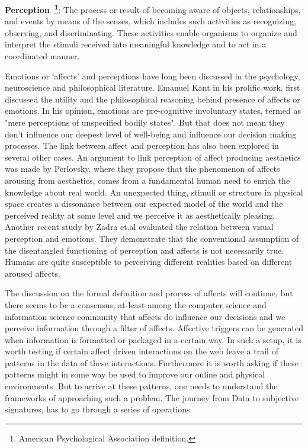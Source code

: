 \begin{definition}
    \textbf{Perception~\footnote{American Psychological Association definition.}}: The process or result of becoming aware of objects, relationships, and events by means of the senses, which includes such activities as recognizing, observing, and discriminating. These activities enable organisms to organize and interpret the stimuli received into meaningful knowledge and to act in a coordinated manner.
\end{definition}


Emotions or `affects' and perceptions have long been discussed in the psychology, neuroscience and philosophical literature. Emanuel Kant in his prolific work, first discussed the utility and the philosophical reasoning behind presence of affects or emotions\cite{kant1987critique}. In his opinion, emotions are pre-cognitive involuntary states, termed as "mere perceptions of unspecified bodily states"\cite{borges2004can}. But that does not mean they don't influence our deepest level of well-being and influence our decision making processes.
The link between affect and perception has also been explored in several other cases. An argument to link perception of affect producing aesthetics was made by Perlovsky\cite{perlovsky2014aesthetic}, where they propose that the phenomenon of affects arousing from aesthetics, comes from a fundamental human need to enrich the knowledge about real world. An unexpected thing, stimuli or structure in physical space creates a dissonance between our expected model of the world and the perceived reality at some level and we perceive it as aesthetically pleasing. Another recent study by Zadra et.al\cite{zadra2011emotion} evaluated the relation between visual perception and emotions. They demonstrate that the conventional assumption of the disentangled functioning of perception and affects is not necessarily true. Humans are quite susceptible to perceiving different realities based on different aroused affects. 

The discussion on the formal definition and process of affects will continue, but there seems to be a consensus, at-least among the computer science and information science community that affects do influence our decisions and we perceive information through a filter of affects. Affective triggers can be generated when information is formatted or packaged in a certain way. In such a setup, it is worth testing if certain affect driven interactions on the web leave a trail of patterns in the data of these interactions. Furthermore it is worth asking if these patterns might in some way be used to improve our online and physical environments. But to arrive at these patterns, one needs to understand the frameworks of approaching such a problem. The journey from Data to subjective signatures, has to go through a series of operations. 

